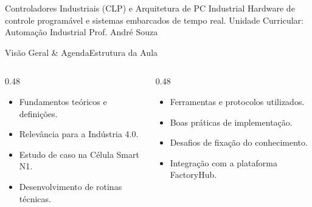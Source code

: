 
\senaicover
  {Controladores Industriais (CLP) e Arquitetura de PC Industrial}
  {Hardware de controle programável e sistemas embarcados de tempo real.}
  {Unidade Curricular: Automação Industrial}
  {Prof. André Souza}

\begin{senaiframe}{Visão Geral \& Agenda}{Estrutura da Aula}
  \begin{columns}[t]
    \begin{column}{0.48\textwidth}
      \begin{tcolorbox}[senaibluecard, title={1. Conceitos Chave}]
        \begin{itemize}
          \item Fundamentos teóricos e definições.
          \item Relevância para a Indústria 4.0.
        \end{itemize}
      \end{tcolorbox}
      \vspace{4pt}
      \begin{tcolorbox}[senaiambercard, title={3. Aplicação Prática}]
        \begin{itemize}
          \item Estudo de caso na Célula Smart N1.
          \item Desenvolvimento de rotinas técnicas.
        \end{itemize}
      \end{tcolorbox}
    \end{column}
    \begin{column}{0.48\textwidth}
      \begin{tcolorbox}[senairedcard, title={2. Detalhamento Técnico}]
        \begin{itemize}
          \item Ferramentas e protocolos utilizados.
          \item Boas práticas de implementação.
        \end{itemize}
      \end{tcolorbox}
      \vspace{4pt}
      \begin{tcolorbox}[senaigreencard, title={4. Exercícios \& Avaliação}]
        \begin{itemize}
          \item Desafios de fixação do conhecimento.
          \item Integração com a plataforma FactoryHub.
        \end{itemize}
      \end{tcolorbox}
    \end{column}
  \end{columns}
\end{senaiframe}

